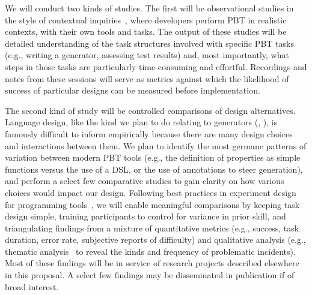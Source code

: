 We will conduct two kinds of studies. The first will be observational
studies in the style of contextual inquiries~\cite[Chapter
3]{ref:holtzblatt1997contextual}, where
developers perform PBT in realistic contexts, with their own tools and tasks.
The output of these studies will be detailed understanding of the task
structures involved with specific PBT tasks (e.g., writing a generator,
assessing test results) and, most importantly, what steps in those tasks are
particularly time-consuming and effortful.  Recordings and notes from
these sessions will serve as metrics against which the
likelihood of success of particular designs can be measured before
implementation.


The second kind of study will be controlled comparisons of design alternatives.
Language design, like the kind we plan to do relating to generators
(, ), is famously
difficult to inform empirically because there are many design choices
and interactions between them. We plan to identify the most germane patterns of
variation between modern PBT tools (e.g., the definition of properties as simple
functions versus the use of a DSL, or the use of annotations to steer
generation), and perform a select few comparative studies to gain
clarity on how various
choices would impact our design. Following best practices in experiment design
for programming tools~\cite{ref:ko2015practical}, we will enable meaningful
comparisons by keeping task design simple, training
participants to control for variance in prior skill, and triangulating findings
from a mixture of
quantitative metrics (e.g., success, task duration, error rate, subjective
reports of difficulty) and qualitative analysis (e.g., thematic
analysis~\cite{ref:blandford2016qualitative} to reveal the kinds and frequency
of problematic incidents). Most of these findings will be in service of research projects described elsewhere
in this proposal. A select few findings may be disseminated in
publication if of broad interest.


